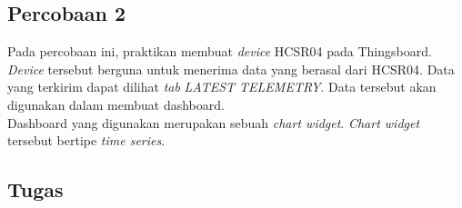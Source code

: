 \documentclass{class}
\begin{document}
    \subsection{Percobaan 2}
    Pada percobaan ini, praktikan membuat \emph{device} HCSR04 pada Thingsboard.
    \emph{Device} tersebut berguna untuk menerima data yang berasal dari HCSR04. 
    Data yang terkirim dapat dilihat \emph{tab} \emph{LATEST TELEMETRY}.
    Data tersebut akan digunakan dalam membuat dashboard. \\
    Dashboard yang digunakan merupakan sebuah \emph{chart widget}.
    \emph{Chart widget} tersebut bertipe \emph{time series}.
    \subsection{Tugas}
\end{document}
